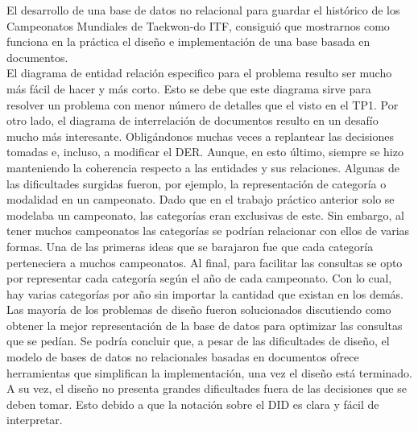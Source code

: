 El desarrollo de una base de datos no relacional para guardar el histórico de los Campeonatos Mundiales de
Taekwon-do ITF, consiguió que mostrarnos como funciona en la práctica el diseño e implementación de una base basada en
documentos.\\

El diagrama de entidad relación especifico para el problema resulto ser mucho más fácil de hacer y más corto.
Esto se debe que este diagrama sirve para resolver un problema con menor número de detalles que el visto en el TP1.
Por otro lado, el diagrama de interrelación de documentos resulto en un desafío mucho más interesante. Obligándonos
muchas veces a replantear las decisiones tomadas e, incluso, a modificar el DER. Aunque, en esto último, siempre se hizo
manteniendo la coherencia respecto a las entidades y sus relaciones. Algunas de las dificultades surgidas fueron, por ejemplo,
la representación de categoría o modalidad en un campeonato. Dado que en el trabajo práctico anterior solo se modelaba un
campeonato, las categorías eran exclusivas de este. Sin embargo, al tener muchos campeonatos las categorías se podrían
relacionar con ellos de varias formas. Una de las primeras ideas que se barajaron fue que cada categoría perteneciera a
muchos campeonatos. Al final, para facilitar las consultas se opto por representar cada categoría según el año de cada
campeonato. Con lo cual, hay varias categorías por año sin importar la cantidad que existan en los demás. Las mayoría
de los problemas de diseño fueron solucionados discutiendo como obtener la mejor representación de la base de datos
para optimizar las consultas que se pedían. Se podría concluir que, a pesar de las dificultades de diseño, el modelo de
bases de datos no relacionales basadas en documentos ofrece herramientas que simplifican la implementación, una vez el
diseño está terminado. A su vez, el diseño no presenta grandes dificultades fuera de las decisiones que se deben tomar.
Esto debido a que la notación sobre el DID es clara y fácil de interpretar.
